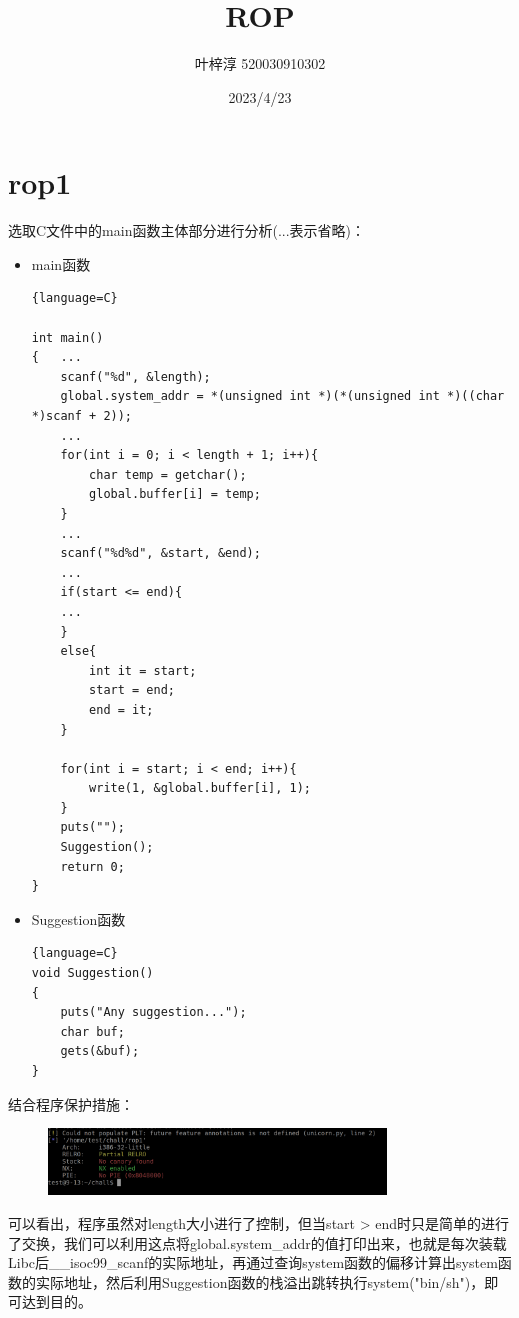 \documentclass{article}
\date{2023/4/23}
\title{ROP}
\author{叶梓淳 520030910302}
\begin{document}
\maketitle

\section{rop1}
    选取C文件中的main函数主体部分进行分析(...表示省略)：
    \begin{itemize}
        \item main函数
        \begin{lstlisting}{language=C}

int main()
{	...
	scanf("%d", &length);
	global.system_addr = *(unsigned int *)(*(unsigned int *)((char *)scanf + 2));
	...
	for(int i = 0; i < length + 1; i++){
		char temp = getchar();
		global.buffer[i] = temp;
	}
	...
	scanf("%d%d", &start, &end);
	...
	if(start <= end){
	...
	}
	else{
		int it = start;
		start = end;
		end = it;
	}

	for(int i = start; i < end; i++){
		write(1, &global.buffer[i], 1);
	}
	puts("");
	Suggestion();
	return 0;
}

        \end{lstlisting}
        \item Suggestion函数
        \begin{lstlisting}{language=C}
void Suggestion()
{
	puts("Any suggestion...");
	char buf;
	gets(&buf);
}
        \end{lstlisting}
  
         
    \end{itemize}
    结合程序保护措施：
    \begin{figure}[H]
    	\begin{center}
    		\includegraphics[width=0.8\textwidth]{1.png}
    	\end{center}
    \end{figure}
    可以看出，程序虽然对length大小进行了控制，但当start > end时只是简单的进行了交换，我们可以利用这点将global.system\_addr的值打印出来，也就是每次装载Libc后\_\_isoc99\_scanf的实际地址，再通过查询system函数的偏移计算出system函数的实际地址，然后利用Suggestion函数的栈溢出跳转执行system("bin/sh")，即可达到目的。 \par
\end{document}
